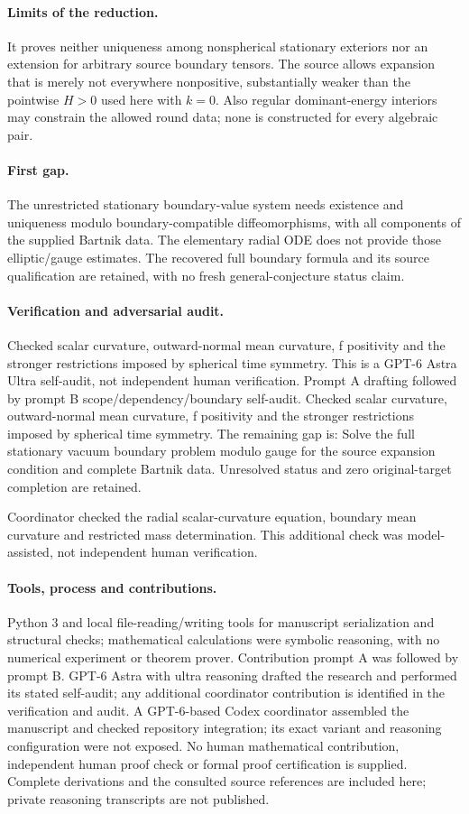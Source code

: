 \documentclass[11pt]{article}
\begin{document}
\paragraph{Limits of the reduction.} It proves neither uniqueness among nonspherical stationary exteriors nor an extension for arbitrary source boundary tensors. The source allows expansion that is merely not everywhere nonpositive, substantially weaker than the pointwise \(H>0\) used here with \(k=0\). Also regular dominant-energy interiors may constrain the allowed round data; none is constructed for every algebraic pair.
\paragraph{First gap.} The unrestricted stationary boundary-value system needs existence and uniqueness modulo boundary-compatible diffeomorphisms, with all components of the supplied Bartnik data. The elementary radial ODE does not provide those elliptic/gauge estimates. The recovered full boundary formula and its source qualification are retained, with no fresh general-conjecture status claim.

\paragraph{Verification and adversarial audit.}
Checked scalar curvature, outward-normal mean curvature, f positivity and the stronger restrictions imposed by spherical time symmetry. This is a GPT-6 Astra Ultra self-audit, not independent human verification. Prompt A drafting followed by prompt B scope/dependency/boundary self-audit. Checked scalar curvature, outward-normal mean curvature, f positivity and the stronger restrictions imposed by spherical time symmetry. The remaining gap is: Solve the full stationary vacuum boundary problem modulo gauge for the source expansion condition and complete Bartnik data. Unresolved status and zero original-target completion are retained.

Coordinator checked the radial scalar-curvature equation, boundary mean curvature and restricted mass determination. This additional check was model-assisted, not independent human verification.

\paragraph{Tools, process and contributions.}
Python 3 and local file-reading/writing tools for manuscript serialization and structural checks; mathematical calculations were symbolic reasoning, with no numerical experiment or theorem prover. Contribution prompt A was followed by prompt B. GPT-6 Astra with ultra reasoning drafted the research and performed its stated self-audit; any additional coordinator contribution is identified in the verification and audit. A GPT-6-based Codex coordinator assembled the manuscript and checked repository integration; its exact variant and reasoning configuration were not exposed. No human mathematical contribution, independent human proof check or formal proof certification is supplied. Complete derivations and the consulted source references are included here; private reasoning transcripts are not published.
\end{document}
